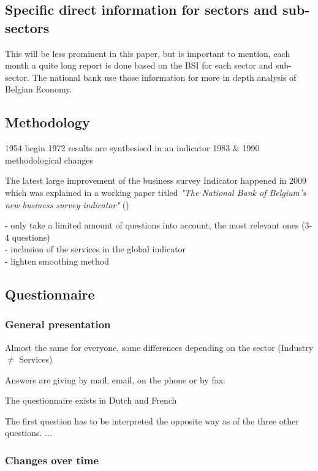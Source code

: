 \documentclass[12pt,a4paper,oneside]{book}
\begin{document}
\subsection{Specific direct information for sectors and sub-sectors}

This will be less prominent in this paper, but is important to mention, each month a quite long report is done based on the BSI for each sector and sub-sector.
The national bank use those information for more in depth analysis of Belgian Economy.


\subsection{Methodology}
\label{section:Methodology}

1954 begin
1972 results are synthesised in an indicator
1983 \& 1990 methodological changes

The latest large improvement of the business survey Indicator happened in 2009 which was explained in a working paper titled \textit{"The National Bank of Belgium’s new business survey indicator"} 
(\citeauthor{de_greef_national_2009})

- only take a limited amount of questions into account, the most relevant ones (3-4 questions) \\
- inclusion of the services in the global indicator \\
- lighten smoothing method




\subsection{Questionnaire}
\label{sec:Questionnaire}

\subsubsection{General presentation}

Almost the same for everyone, some differences depending on the sector (Industry $\neq$ Services)

Answers are giving by mail, email, on the phone or by fax.

The questionnaire exists in Dutch and French

The first question has to be interpreted the opposite way as of the three other questions. ...


\subsubsection{Changes over time}
\end{document}
